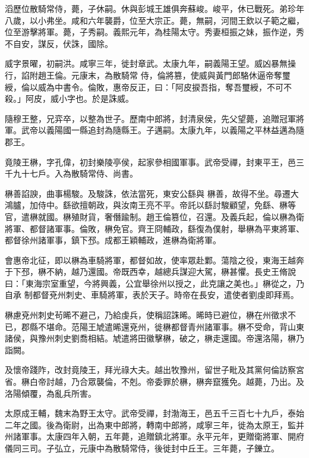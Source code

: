 \begin{pinyinscope}
 滔歷位散騎常侍，薨，子休嗣。休與彭城王雄俱奔蘇峻。峻平，休已戰死。弟珍年八歲，以小弗坐。咸和六年襲爵，位至大宗正。薨，無嗣，河間王欽以子範之繼，位至游擊將軍。薨，子秀嗣。義熙元年，為桂陽太守。秀妻桓振之妹，振作逆，秀不自安，謀反，伏誅，國除。



 威字景曜，初嗣洪。咸寧三年，徙封章武。太康九年，嗣義陽王望。威凶暴無操行，諂附趙王倫。元康末，為散騎常
 侍，倫將篡，使威與黃門郎駱休逼帝奪璽綬，倫以威為中書令。倫敗，惠帝反正，曰：「阿皮捩吾指，奪吾璽綬，不可不殺。」阿皮，威小字也。於是誅威。



 隨穆王整，兄弈卒，以整為世子。歷南中郎將，封清泉侯，先父望薨，追贈冠軍將軍。武帝以義陽國一縣追封為隨縣王。子邁嗣。太康九年，以義陽之平林益邁為隨郡王。



 竟陵王楙，字孔偉，初封樂陵亭侯，起家參相國軍事。武帝受禪，封東平王，邑三千九十七戶。入為散騎常侍、尚書。



 楙善諂諛，曲事楊駿。及駿誅，依法當死，東安公繇與
 楙善，故得不坐。尋遷大鴻臚，加侍中。繇欲擅朝政，與汝南王亮不平。帝託以繇討駿顧望，免繇、楙等官，遣楙就國。楙殖財貨，奢僭踰制。趙王倫篡位，召還。及義兵起，倫以楙為衛將軍、都督諸軍事。倫敗，楙免官。齊王冏輔政，繇復為僕射，舉楙為平東將軍、都督徐州諸軍事，鎮下邳。成都王穎輔政，進楙為衛將軍。



 會惠帝北征，即以楙為車騎將軍，都督如故，使率眾赴鄴。蕩陰之役，東海王越奔于下邳，楙不納，越乃還國。帝既西幸，越總兵謀迎大駕，楙甚懼。長史王脩說曰：「東海宗室重望，今將興義，公宜舉徐州以授之，此克讓之美也。」楙從之，乃自承
 制都督兗州刺史、車騎將軍，表於天子。時帝在長安，遣使者劉虔即拜焉。



 楙慮兗州刺史茍晞不避己，乃給虔兵，使稱詔誅晞。晞時已避位，楙在州徵求不已，郡縣不堪命。范陽王虓遣晞還兗州，徙楙都督青州諸軍事。楙不受命，背山東諸侯，與豫州刺史劉喬相結。虓遣將田徽擊楙，破之，楙走還國。帝還洛陽，楙乃詣闕。



 及懷帝踐阼，改封竟陵王，拜光祿大夫。越出牧豫州，留世子毗及其黨何倫訪察宮省。楙白帝討越，乃合眾襲倫，不剋。帝委罪於楙，楙奔竄獲免。越薨，乃出。及洛陽傾覆，為亂兵所害。



 太原成王輔，魏末為野王太守。武帝受禪，封渤海王，邑五千三百七十九戶，泰始二年之國。後為衛尉，出為東中郎將，轉南中郎將，咸寧三年，徙為太原王，監并州諸軍事。太康四年入朝，五年薨，追贈鎮北將軍。永平元年，更贈衛將軍、開府儀同三司。子弘立，元康中為散騎常侍，後徙封中丘王。三年薨，子鑠立。




\end{pinyinscope}
